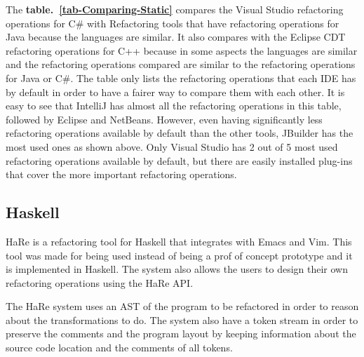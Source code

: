 The {\bf table.~\ref{tab-Comparing-Static}} compares the Visual Studio refactoring operations for C\# with Refactoring tools that have refactoring operations for Java because the languages are similar. It also compares with the Eclipse CDT  refactoring operations for C++ because in some aspects the languages are similar and the refactoring operations compared are similar to the refactoring operations for Java or C\#. 
The table only lists the refactoring operations that each IDE has by default in order to have a fairer way to compare them with each other.
It is easy to see that IntelliJ has almost all the refactoring operations in this table, followed by Eclipse and NetBeans.
However, even having significantly less refactoring operations available by default than the other tools, JBuilder has the most used ones as shown above.
Only Visual Studio has 2 out of 5 most used refactoring operations available by default, but there are easily installed plug-ins that cover the more important refactoring operations. 



\subsection{Haskell}

HaRe \cite{thompson2005refactoring} is a refactoring tool for Haskell that integrates with Emacs and Vim.
This tool was made for being used instead of being a prof of concept prototype and it is implemented in Haskell.
The system also allows the users to design their own refactoring operations using the HaRe API.

The HaRe system uses an AST of the program to be refactored in order to reason about the transformations to do.
The system also have a token stream in order to preserve the comments and the program layout by keeping information about the source code location and the comments of all tokens.




